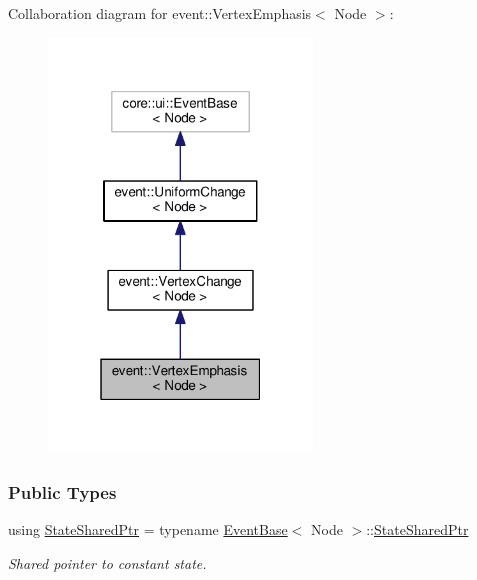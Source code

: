 Collaboration diagram for event\+:\+:Vertex\+Emphasis$<$ Node $>$\+:\nopagebreak
\begin{figure}[H]
\begin{center}
\leavevmode
\includegraphics[width=199pt]{structevent_1_1VertexEmphasis__coll__graph}
\end{center}
\end{figure}
\subsubsection*{Public Types}
\begin{DoxyCompactItemize}
\item 
using \hyperlink{structevent_1_1VertexEmphasis_aeb2bf5f9be1943f67b74a3a3bfbd34c3}{State\+Shared\+Ptr} = typename \hyperlink{structEventBase}{Event\+Base}$<$ Node $>$\+::\hyperlink{structevent_1_1UniformChange_a8f41f1a24c711875b55419d9f0eb6bd2}{State\+Shared\+Ptr}\hypertarget{structevent_1_1VertexEmphasis_aeb2bf5f9be1943f67b74a3a3bfbd34c3}{}\label{structevent_1_1VertexEmphasis_aeb2bf5f9be1943f67b74a3a3bfbd34c3}

\begin{DoxyCompactList}\small\item\em Shared pointer to constant state. \end{DoxyCompactList}\end{DoxyCompactItemize}
